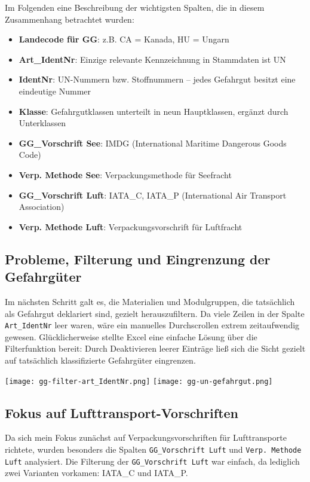 Im Folgenden eine Beschreibung der wichtigsten Spalten, die in diesem Zusammenhang betrachtet wurden:

\begin{itemize}
  \item \textbf{Landecode für GG}: z.B. CA = Kanada, HU = Ungarn
  \item \textbf{Art\_IdentNr}: Einzige relevante Kennzeichnung in Stammdaten ist \glqq UN\grqq
  \item \textbf{IdentNr}: UN-Nummern bzw. Stoffnummern – jedes Gefahrgut besitzt eine eindeutige Nummer
  \item \textbf{Klasse}: Gefahrgutklassen unterteilt in neun Hauptklassen, ergänzt durch Unterklassen 
  \item \textbf{GG\_Vorschrift See}: IMDG (International Maritime Dangerous Goods Code)
  \item \textbf{Verp. Methode See}: Verpackungsmethode für Seefracht
  \item \textbf{GG\_Vorschrift Luft}: IATA\_C, IATA\_P (International Air Transport Association)
  \item \textbf{Verp. Methode Luft}: Verpackungsvorschrift für Luftfracht
\end{itemize}

\subsection{Probleme, Filterung und Eingrenzung der Gefahrgüter}
Im nächsten Schritt galt es, die Materialien und Modulgruppen, die tatsächlich als Gefahrgut deklariert sind, 
gezielt herauszufiltern. Da viele Zeilen in der Spalte \texttt{Art\_IdentNr} leer waren, wäre ein manuelles 
Durchscrollen extrem zeitaufwendig gewesen. Glücklicherweise stellte Excel eine einfache Lösung über die Filterfunktion 
bereit: Durch Deaktivieren leerer Einträge ließ sich die Sicht gezielt auf tatsächlich klassifizierte Gefahrgüter 
eingrenzen.

\begin{center}
  \texttt{[image: gg-filter-art\_IdentNr.png]}
  \texttt{[image: gg-un-gefahrgut.png]}
\end{center}


\subsection{Fokus auf Lufttransport-Vorschriften}
Da sich mein Fokus zunächst auf Verpackungsvorschriften für Lufttransporte richtete, wurden besonders die 
Spalten \texttt{GG\_Vorschrift Luft} und \texttt{Verp. Methode Luft} analysiert. Die Filterung der 
\texttt{GG\_Vorschrift Luft} war einfach, da lediglich zwei Varianten vorkamen: IATA\_C und IATA\_P.

